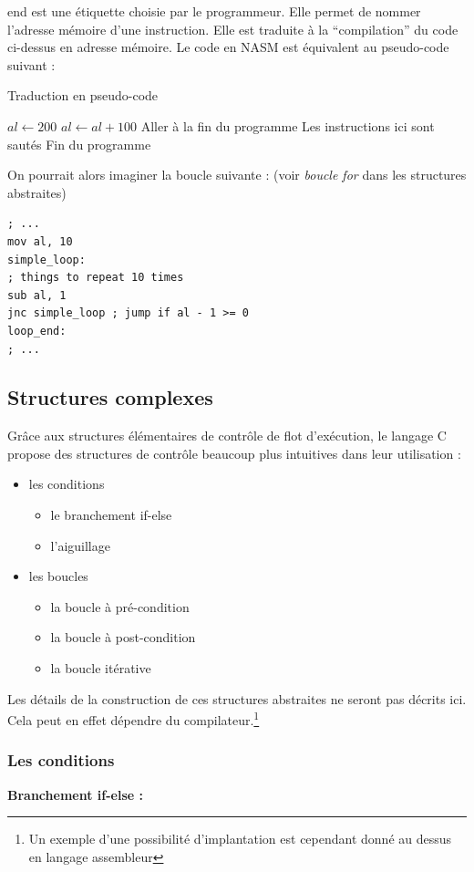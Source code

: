 \documentclass[../../../main.tex]{subfiles}
\begin{document}
\textsf{end} est une étiquette choisie par le programmeur. Elle permet de nommer l'adresse mémoire d'une instruction. Elle est traduite à la ``compilation'' du code ci-dessus en adresse mémoire. Le code en NASM est équivalent au pseudo-code suivant :
\begin{algorithm}
\caption{Traduction en pseudo-code}\label{alg:two}
$al\leftarrow 200$\;
$al\leftarrow al + 100$\;
 {
	Aller à la fin du programme\;
} {
	Les instructions ici sont sautés
}
Fin du programme\;
\end{algorithm}\newline
On pourrait alors imaginer la boucle suivante : (voir \textit{boucle for} dans les structures abstraites)
\begin{verbatim}
; ...
mov al, 10
simple_loop:
; things to repeat 10 times
sub al, 1
jnc simple_loop ; jump if al - 1 >= 0
loop_end:
; ...
\end{verbatim}
\subsection{Structures complexes}
Grâce aux structures élémentaires de contrôle de flot d'exécution, le langage C propose des structures de contrôle beaucoup plus intuitives dans leur utilisation :
\begin{itemize}
	\item les conditions
	\begin{itemize}
	\item le branchement \textsf{if-else}
	\item l'aiguillage
	\end{itemize}
	\item les boucles
	\begin{itemize}
		\item la boucle à pré-condition
		\item la boucle à post-condition
		\item la boucle itérative
	\end{itemize}
\end{itemize}
Les détails de la construction de ces structures abstraites ne seront pas décrits ici. Cela peut en effet dépendre du compilateur.\footnote{Un exemple d'une possibilité d'implantation est cependant donné au dessus en langage assembleur}
\subsubsection{Les conditions}
\vspace*{2mm}
\textbf{Branchement \textsf{if-else} :}
 
\end{document}
